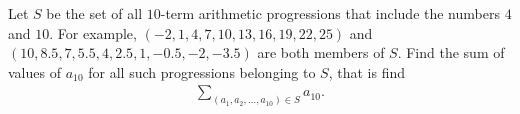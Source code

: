 Let $S$ be the set of all $10$-term arithmetic progressions that include the numbers $4$ and $10$. For example, ${(-2,1,4,7,10,13,16,19,22,25)}$ and ${(10,8.5,7,5.5,4,2.5,1,-0.5,-2,-3.5)}$ are both members of $S$. Find the sum of values of $a_{10}$ for all such progressions belonging to $S$, that is find
\begin{align*}
\displaystyle\sum_{(a_{1},a_{2},\ldots,a_{10})\in S} a_{10}.
\end{align*}